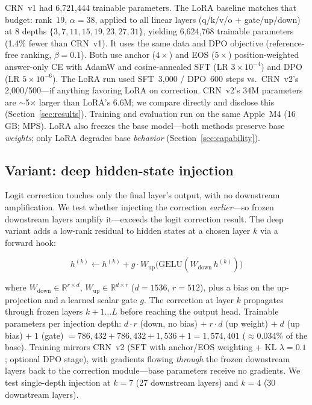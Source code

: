 \documentclass[11pt]{article}
\begin{document}
CRN~v1 had 6{,}721{,}444 trainable parameters.
The LoRA baseline matches that budget: rank~$19$, $\alpha{=}38$, applied to all linear layers (q/k/v/o + gate/up/down) at 8 depths $\{3,7,11,15,19,23,27,31\}$, yielding 6{,}624{,}768 trainable parameters (1.4\% fewer than CRN~v1).
It uses the same data and DPO objective (reference-free ranking, $\beta{=}0.1$).
Both use anchor ($4\times$) and EOS ($5\times$) position-weighted answer-only CE with AdamW and cosine-annealed SFT (LR $3{\times}10^{-4}$) and DPO (LR $5{\times}10^{-6}$).
The LoRA run used SFT~3{,}000 / DPO~600 steps vs.\ CRN~v2's 2{,}000/500---if anything favoring LoRA on correction.
CRN~v2's 34M parameters are $\sim$5$\times$ larger than LoRA's 6.6M; we compare directly and disclose this (Section~\ref{sec:results}).
Training and evaluation run on the same Apple~M4 (16\,GB; MPS).
LoRA also freezes the base model---both methods preserve base \emph{weights}; only LoRA degrades base \emph{behavior} (Section~\ref{sec:capability}).

\subsection{Variant: deep hidden-state injection}
\label{sec:deep}

Logit correction touches only the final layer's output, with no downstream amplification.
We test whether injecting the correction \emph{earlier}---so frozen downstream layers amplify it---exceeds the logit correction result.
The deep variant adds a low-rank residual to hidden states at a chosen layer $k$ via a forward hook:

\begin{equation}
h^{(k)} \leftarrow h^{(k)} + g \cdot W_{\text{up}}\!\big(\text{GELU}(W_{\text{down}}\,h^{(k)})\big)
\label{eq:crn_deep}
\end{equation}

where $W_{\text{down}} \in \mathbb{R}^{r \times d}$, $W_{\text{up}} \in \mathbb{R}^{d \times r}$ ($d{=}1536$, $r{=}512$), plus a bias on the up-projection and a learned scalar gate $g$.
The correction at layer $k$ propagates through frozen layers $k{+}1 \dots L$ before reaching the output head.
Trainable parameters per injection depth: $d{\cdot}r$ (down, no bias) $+\; r{\cdot}d$ (up weight) $+\; d$ (up bias) $+\; 1$ (gate) $= 786{,}432 + 786{,}432 + 1{,}536 + 1 = 1{,}574{,}401$ ($\approx$0.034\% of the base).
Training mirrors CRN~v2 (SFT with anchor/EOS weighting $+$ KL $\lambda{=}0.1$; optional DPO stage), with gradients flowing \emph{through} the frozen downstream layers back to the correction module---base parameters receive no gradients.
We test single-depth injection at $k{=}7$ (27 downstream layers) and $k{=}4$ (30 downstream layers).
\end{document}
